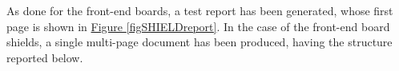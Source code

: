 \par
As done for the front-end boards, a test report has been generated, whose first page is shown in \hyperref[figSHIELDreport]{Figure \ref{figSHIELDreport}}. In the case of the front-end board shields, a single multi-page document has been produced, having the structure reported below.

\begin{table}[ht]
    \centering
    \def\arraystretch{1.3}
    \caption{Structure of the entry for the front-end board shields test report.}
    \label{tabSHIELDstruct}
\end{table}
